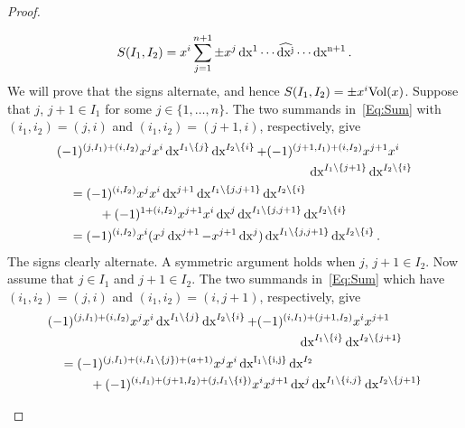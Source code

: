 \documentclass[\MainFolder/Text.tex]{subfiles}
\begin{document}
\begin{proof}
\begin{description}[font=\normalfont\itshape]
\begin{equation*} \label{Eq:AlternatingSum}
S(I_1,I_2) = x^i \sum_{j=1}^{n+1}  \pm  x^j \operatorname{dx^1} \dotsm \widehat{\operatorname{dx^j}} \dotsm \operatorname{dx^{n+1}}.
\end{equation*}
%
We will prove that the signs alternate, and hence $S(I_1,I_2)= \pm x^i \mathrm{Vol}(x)$. Suppose that $j$, $j+1 \in I_{1}$ for some $j\in \{1,\ldots,n\}$. The two summands in~\eqref{Eq:Sum} with $(i_1, i_2)=(j, i)$ and $(i_1, i_2)= (j+1,i)$, respectively, give
\allowdisplaybreaks
\begin{align*}
& \begin{multlined}[t](-1)^{(j,I_1) + (i,I_2)} x^{j} x^{i} \Diff{x}^{I_1\backslash\{j\}} \Diff{x}^{I_2\backslash\{i\}} + (-1)^{(j+1,I_1) + (i,I_2)} x^{j+1} x^{i} \\ \Diff{x}^{I_1\backslash\{j+1\}}\Diff{x}^{I_2\backslash\{i\}} \end{multlined}
\\ &\quad= \begin{multlined}[t] (-1)^{(i,I_2)} x^{j} x^{i} \Diff{x}^{j+1}\Diff{x}^{I_1\backslash\{j, j+1\}} \Diff{x}^{I_2\backslash\{i\}}  \\ {}+ (-1)^{1 + (i,I_2)} x^{j+1} x^{i} \Diff{x}^j \Diff{x}^{I_1\backslash\{j, j+1\}} \Diff{x}^{I_2\backslash\{i\}} \end{multlined} \\
&\quad = (-1)^{(i,I_2)}x^i (x^j \Diff{x}^{j+1} - x^{j+1} \Diff{x}^j) \Diff{x}^{I_1\backslash\{j, j+1\}} \Diff{x}^{I_2\backslash\{i\}}.
\end{align*}
The signs clearly alternate. A symmetric argument holds when $j$, $j+1\in I_2$. Now assume that $j \in I_1$ and $j+1\in I_2$. The two summands in~\eqref{Eq:Sum} which have $(i_1, i_2)=(j,i)$ and $(i_1, i_2) = (i,j+1)$, respectively, give
\allowdisplaybreaks
\begin{align*}
& \begin{multlined}[t] (-1)^{(j,I_1)+(i,I_2)} x^j x^i \Diff{x}^{I_1\backslash\{j\}}\Diff{x}^{I_2\backslash\{i\}} + (-1)^{(i,I_1) + (j+1,I_2)} x^i x^{j+1} \\ \Diff{x}^{I_1\backslash\{i\}}\Diff{x}^{I_2\backslash\{j+1\}} \end{multlined}\\
&\quad=\begin{multlined}[t]
(-1)^{(j,I_1)+(i,I_1\backslash\{j\}) + (a + 1)} x^j x^i \Diff{x^{I_1\backslash\{i, j\}}}\Diff{x}^{I_2} \\ {}+ (-1)^{(i,I_1) + (j+1,I_2) + (j,I_1\backslash\{i\})} x^i x^{j+1} \Diff{x}^j \Diff{x}^{I_1\backslash\{i, j\}} \Diff{x}^{I_2\backslash\{j+1\}}

\end{multlined}
\end{align*}
\end{description}
\end{proof}
\end{document}

